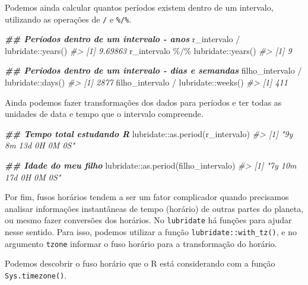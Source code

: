 \documentclass[
]{book}
\newenvironment{Shaded}{\begin{snugshade}}{\end{snugshade}}
\newcommand{\CommentTok}[1]{\textcolor[rgb]{0.37,0.37,0.37}{\textit{#1}}}
\newcommand{\DocumentationTok}[1]{\textcolor[rgb]{0.37,0.37,0.37}{\textbf{\textit{#1}}}}
\newcommand{\FunctionTok}[1]{\textcolor[rgb]{0,0,0}{#1}}
\newcommand{\NormalTok}[1]{#1}
\newcommand{\SpecialCharTok}[1]{\textcolor[rgb]{0,0,0}{#1}}
\begin{document}
Podemos ainda calcular quantos períodos existem dentro de um intervalo, utilizando as operações de \texttt{/} e \texttt{\%/\%}.

\begin{Shaded}
\begin{Highlighting}[]
\DocumentationTok{\#\# Períodos dentro de um intervalo {-} anos}
\NormalTok{r\_intervalo }\SpecialCharTok{/}\NormalTok{ lubridate}\SpecialCharTok{::}\FunctionTok{years}\NormalTok{()}
\CommentTok{\#\textgreater{} [1] 9.69863}
\NormalTok{r\_intervalo }\SpecialCharTok{\%/\%}\NormalTok{ lubridate}\SpecialCharTok{::}\FunctionTok{years}\NormalTok{()}
\CommentTok{\#\textgreater{} [1] 9}

\DocumentationTok{\#\# Períodos dentro de um intervalo {-} dias e semandas}
\NormalTok{filho\_intervalo }\SpecialCharTok{/}\NormalTok{ lubridate}\SpecialCharTok{::}\FunctionTok{days}\NormalTok{()}
\CommentTok{\#\textgreater{} [1] 2877}
\NormalTok{filho\_intervalo }\SpecialCharTok{/}\NormalTok{ lubridate}\SpecialCharTok{::}\FunctionTok{weeks}\NormalTok{()}
\CommentTok{\#\textgreater{} [1] 411}
\end{Highlighting}
\end{Shaded}

Ainda podemos fazer transformações dos dados para períodos e ter todas as unidades de data e tempo que o intervalo compreende.

\begin{Shaded}
\begin{Highlighting}[]
\DocumentationTok{\#\# Tempo total estudando R}
\NormalTok{lubridate}\SpecialCharTok{::}\FunctionTok{as.period}\NormalTok{(r\_intervalo)}
\CommentTok{\#\textgreater{} [1] "9y 8m 13d 0H 0M 0S"}

\DocumentationTok{\#\# Idade do meu filho}
\NormalTok{lubridate}\SpecialCharTok{::}\FunctionTok{as.period}\NormalTok{(filho\_intervalo)}
\CommentTok{\#\textgreater{} [1] "7y 10m 17d 0H 0M 0S"}
\end{Highlighting}
\end{Shaded}

Por fim, fusos horários tendem a ser um fator complicador quando precisamos analisar informações instantâneas de tempo (horário) de outras partes do planeta, ou mesmo fazer conversões dos horários. No \texttt{lubridate} há funções para ajudar nesse sentido. Para isso, podemos utilizar a função \texttt{lubridate::with\_tz()}, e no argumento \texttt{tzone} informar o fuso horário para a transformação do horário.

Podemos descobrir o fuso horário que o R está considerando com a função \texttt{Sys.timezone()}.
\end{document}
